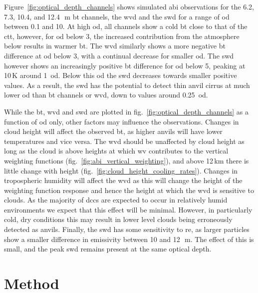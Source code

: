 Figure~\ref{fig:optical_depth_channels} shows simulated \acrshort{abi} observations for the 6.2, 7.3, 10.4, and 12.4\,\unit{\mu m} \acrshort{bt} channels, the \acrshort{wvd} and the \acrshort{swd} for a range of \acrshort{od} between 0.1 and 10.
At high \acrshort{od}, all channels show a cold \acrshort{bt} close to that of the \acrshort{ctt}, however, for \acrshort{od} below 3, the increased contribution from the atmosphere below results in warmer \acrshort{bt}.
The \acrshort{wvd} similarly shows a more negative \acrshort{bt} difference at \acrshort{od} below 3, with a continual decrease for smaller \acrshort{od}.
The \acrshort{swd} however shows an increasingly positive \acrshort{bt} difference for \acrshort{od} below 5, peaking at 10\,\unit{K} around 1~\acrshort{od}.
Below this \acrshort{od} the \acrshort{swd} decreases towards smaller positive values.
As a result, the \acrshort{swd} has the potential to detect thin anvil cirrus at much lower \acrshort{od} than \acrshort{bt} channels or \acrshort{wvd}, down to values around 0.25~\acrfull{od}.

While the \acrshort{bt}, \acrshort{wvd} and \acrshort{swd} are plotted in fig.~\ref{fig:optical_depth_channels} as a function of \acrshort{od} only, other factors may influence the observations.
Changes in cloud height will affect the observed \acrshort{bt}, as higher anvils will have lower temperatures and vice versa.
The \acrshort{wvd} should be unaffected by cloud height as long as the cloud is above heights at which \acrshort{wv} contributes to the vertical weighting functions (fig.~\ref{fig:abi_vertical_weighting}), and above 12\,km there is little change with height (fig.~\ref{fig:cloud_height_cooling_rates}). 
Changes in tropospheric humidity will affect the \acrshort{wvd} as this will change the height of the weighting function response and hence the height at which the \acrshort{wvd} is sensitive to clouds.
As the majority of \acrshort{dcc}s are expected to occur in relatively humid environments we expect that this effect will be minimal.
However, in particularly cold, dry conditions this may result in lower level clouds being erroneously detected as anvils.
Finally, the \acrshort{swd} has some sensitivity to \acrshort{re}, as larger particles show a smaller difference in emissivity between 10 and 12\,\unit{\mu m}.
The effect of this is small, and the peak \acrshort{swd} remains present at the same optical depth.


\section{Method} \label{sec:tracking_method}

